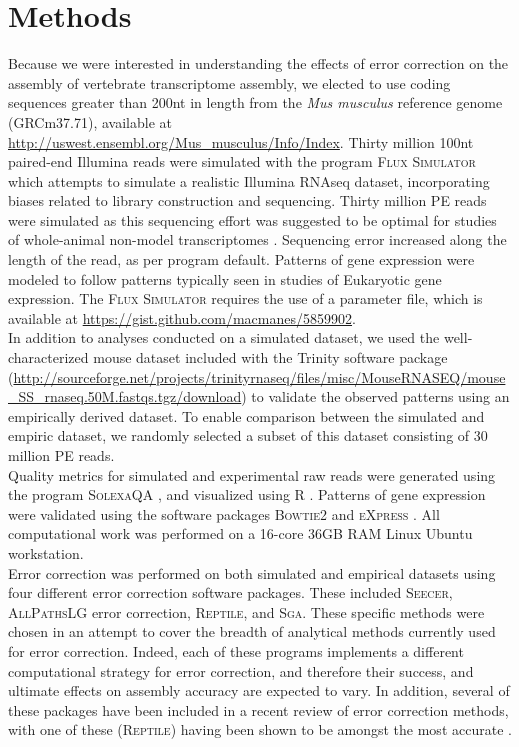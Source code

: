 \documentclass[11pt]{article}
\begin{document}
\noindent


\section*{Methods}
Because we were interested in understanding the effects of error correction on the assembly of vertebrate transcriptome assembly, we elected to use coding sequences greater than 200nt in length from the \textit{Mus musculus} reference genome (GRCm37.71), available at \url{http://uswest.ensembl.org/Mus_musculus/Info/Index}.  Thirty million 100nt paired-end Illumina reads were simulated with the program \textsc{Flux Simulator} \citep{Griebel:2012ti} which attempts to simulate a realistic Illumina RNAseq dataset, incorporating biases related to library construction and sequencing. Thirty million PE reads were simulated as this sequencing effort was suggested to be optimal for studies of whole-animal non-model transcriptomes \citep{Francis:2013gc}. Sequencing error increased along the length of the read, as per program default. Patterns of gene expression were modeled to follow patterns typically seen in studies of Eukaryotic gene expression. The \textsc{Flux Simulator} requires the use of a parameter file, which is available at \url{https://gist.github.com/macmanes/5859902}.  \\

\noindent
In addition to analyses conducted on a simulated dataset, we used the well-characterized mouse dataset included with the Trinity software package (\url{http://sourceforge.net/projects/trinityrnaseq/files/misc/MouseRNASEQ/mouse_SS_rnaseq.50M.fastqs.tgz/download}) to validate the observed patterns using an empirically derived dataset.  To enable comparison between the simulated and empiric dataset, we randomly selected a subset of this dataset consisting of 30 million PE reads. \\

\noindent
Quality metrics for simulated and experimental raw reads were generated using the program \textsc{SolexaQA} \citep{Cox:2010ch}, and visualized using R \citep{RALanguageandEn:wf}. Patterns of gene expression were validated using the software packages \textsc{Bowtie2} \citep{Trapnell:2010kd} and \textsc{eXpress} \citep{Roberts:2012dh}. All computational work was performed on a 16-core 36GB RAM Linux Ubuntu workstation. \\

\noindent
Error correction was performed on both simulated and empirical datasets using four different error correction software packages. These included \textsc{Seecer}, \textsc{AllPathsLG} error correction, \textsc{Reptile}, and \textsc{Sga}. These specific methods were chosen in an attempt to cover the breadth of analytical methods currently used for error correction. Indeed, each of these programs implements a different computational strategy for error correction, and therefore their success, and ultimate effects on assembly accuracy are expected to vary.  In addition, several of these packages have been included in a recent review of error correction methods, with one of these (\textsc{Reptile}) having been shown to be amongst the most accurate \citep{Yang:2013ck}.  \\
\end{document}
